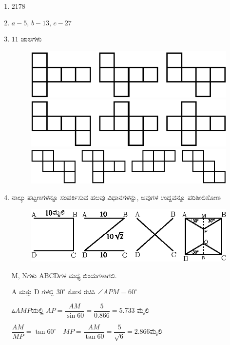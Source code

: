 \begin{enumerate}
\item $2178$

\item $a - 5$, $b - 13$, $c - 27$

\item $11$ ಜಾಲಗಳು 
\begin{figure}[H]
\centering
\includegraphics{images/chap3/ans22a.eps}
\includegraphics{images/chap3/ans22b.eps}
\includegraphics{images/chap3/ans22c.eps}
\end{figure}

\item ನಾಲ್ಕು ಪಟ್ಟಣಗಳನ್ನೂ ಸಂಪರ್ಕಿಸುವ ಹಲವು ವಿಧಾನಗಳನ್ನು, ಅವುಗಳ ಉದ್ದವನ್ನೂ ಪರಿಶೀಲಿಸೋಣ
\begin{figure}[H]
\centering
\includegraphics{images/chap3/ans23.eps}
\end{figure}

M, Nಗಳು ABCDಗಳ ಮಧ್ಯ ಬಿಂದುಗಳಾಗಲಿ. 

A ಮತ್ತು D ಗಳಲ್ಲಿ $30^{\circ}$ ಕೋನ ರಚಿಸಿ $\angle{APM} = 60^{\circ}$

$\vartriangle AMP$ಯಲ್ಲಿ $AP = \dfrac{AM}{\sin 60} = \dfrac{5}{0.866} = 5.733$ ಮೈಲಿ 

$\dfrac{AM}{MP} = \tan 60^{\circ}\quad MP = \dfrac{AM}{\tan 60} = \dfrac{5}{\sqrt{6}} = 2.866$ಮೈಲಿ 



\end{enumerate}
